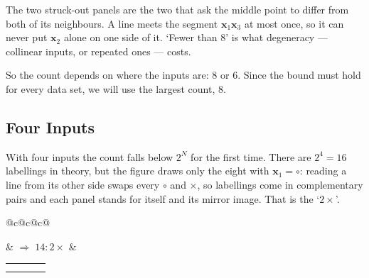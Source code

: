 \begin{observation}
    The two struck-out panels are the two that ask the middle point to differ
    from both of its neighbours. A line meets the segment
    \(\bm{x}_1 \bm{x}_3\) at most once, so it can never put \(\bm{x}_2\) alone
    on one side of it. `Fewer than \(8\)' is what degeneracy --- collinear
    inputs, or repeated ones --- costs.
\end{observation}

So the count depends on where the inputs are: \(8\) or \(6\). Since the bound
must hold for every data set, we will use the largest count, \(8\).

\subsection{Four Inputs}

With four inputs the count falls below \(2^N\) for the first time. There are
\(2^4 = 16\) labellings in theory, but the figure draws only the eight with
\(\bm{x}_1 = \circ\): reading a line from its other side swaps every \(\circ\)
and \(\times\), so labellings come in complementary pairs and each panel stands
for itself and its mirror image. That is the `\(2\times\)'.

\begin{center}
    \begin{tabular}{@{}c@{\quad}c@{\quad}c@{}}
        \begin{tikzpicture}[scale=0.95, baseline=(current bounding box.center)]
            \draw[dashed, black!60] (0,0) rectangle (3.2,3.0);
            \node[circle, fill=black, inner sep=1.1pt] at (1.55,2.25) {};
            \node[above left, font=\small, inner sep=1.5pt] at (1.55,2.25)
                {\(\bm{x}_1\)};
            \node[circle, fill=black, inner sep=1.1pt] at (0.80,1.45) {};
            \node[left, font=\small, inner sep=2pt] at (0.80,1.45) {\(\bm{x}_2\)};
            \node[circle, fill=black, inner sep=1.1pt] at (1.95,0.70) {};
            \node[below, font=\small, inner sep=2pt] at (1.95,0.70) {\(\bm{x}_3\)};
            \node[circle, fill=black, inner sep=1.1pt] at (2.45,1.60) {};
            \node[right, font=\small, inner sep=2pt] at (2.45,1.60) {\(\bm{x}_4\)};
        \end{tikzpicture}
        & \(\Longrightarrow\; 14 \colon 2 \times\) &
        \begin{tabular}{@{}c@{\;}c@{\;}c@{\;}c@{}}
            \dichfour{oooo} & \dichfour{ooox} & \dichfour{ooxo}
            & \dichfour[veto]{oxox}\\
            \dichfour{ooxx} & \dichfour{oxxo} & \dichfour{oxoo}
            & \dichfour{oxxx}
        \end{tabular}
    \end{tabular}
\end{center}

